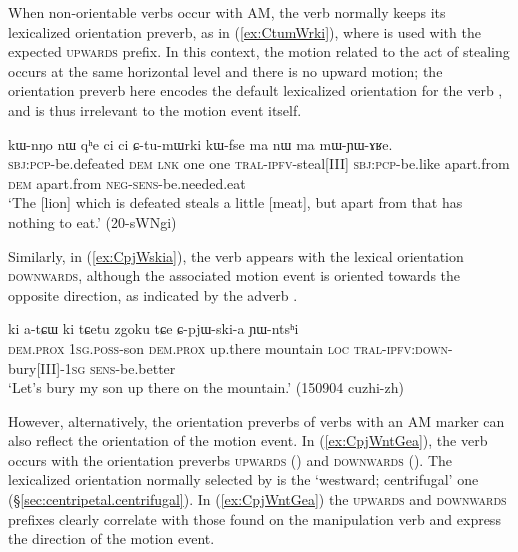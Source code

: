 When non-orientable verbs occur with AM, the verb normally keeps its lexicalized orientation preverb, as in (\ref{ex:CtumWrki}), where  is used with the expected  \textsc{upwards} prefix. In this context, the motion related to the act of stealing occurs at the same horizontal level and there is no upward motion; the orientation preverb here encodes the default lexicalized orientation for the verb , and is thus irrelevant to the motion event itself.

\begin{exe}
\ex \label{ex:CtumWrki}
 \gll kɯ-nŋo nɯ qʰe ci ci ɕ-tu-mɯrki kɯ-fse ma nɯ ma mɯ-ɲɯ-ɤʁe. \\
\textsc{sbj}:\textsc{pcp}-be.defeated \textsc{dem} \textsc{lnk} one one \textsc{tral}-\textsc{ipfv}-steal[III] \textsc{sbj}:\textsc{pcp}-be.like apart.from \textsc{dem} apart.from \textsc{neg}-\textsc{sens}-be.needed.eat \\
\glt `The [lion] which is defeated steals a little [meat], but apart from that has nothing to eat.' (20-sWNgi)
\end{exe}

Similarly, in (\ref{ex:CpjWskia}), the verb  appears with the lexical orientation \textsc{downwards}, although the associated motion event is oriented towards the opposite direction, as indicated by the adverb .

\begin{exe}
\ex \label{ex:CpjWskia}
 \gll ki a-tɕɯ ki tɕetu zgoku tɕe ɕ-pjɯ-ski-a ɲɯ-ntsʰi \\
 \textsc{dem}.\textsc{prox} \textsc{1sg}.\textsc{poss}-son \textsc{dem}.\textsc{prox} up.there mountain \textsc{loc} \textsc{tral}-\textsc{ipfv}:\textsc{down}-bury[III]-\textsc{1sg} \textsc{sens}-be.better \\
 \glt `Let's bury my son up there on the mountain.' (150904 cuzhi-zh)
\end{exe}

However, alternatively, the orientation preverbs of verbs with an AM marker can also reflect the orientation of the motion event. In (\ref{ex:CpjWntGea}), the verb  occurs with the orientation preverbs \textsc{upwards} () and \textsc{downwards}  (). The lexicalized orientation normally selected by   is the `westward; centrifugal' one (§\ref{sec:centripetal.centrifugal}). In (\ref{ex:CpjWntGea}) the \textsc{upwards} and \textsc{downwards} prefixes clearly correlate with those found on the manipulation verb  and express the direction of the motion event.

